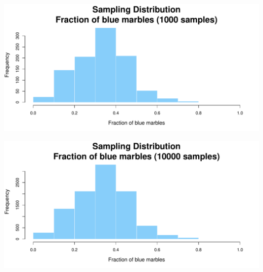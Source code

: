 \documentclass[aspectratio=169]{beamer}
\theoremstyle{principle}
\begin{document}
\begin{frame}
\begin{center}
\includegraphics[scale=0.57]{hist_1000_samples.pdf}
\end{center}
\end{frame}

\begin{frame}
\begin{center}
\includegraphics[scale=0.57]{hist_10000_samples.pdf}
\end{center}
\end{frame}
\end{document}
